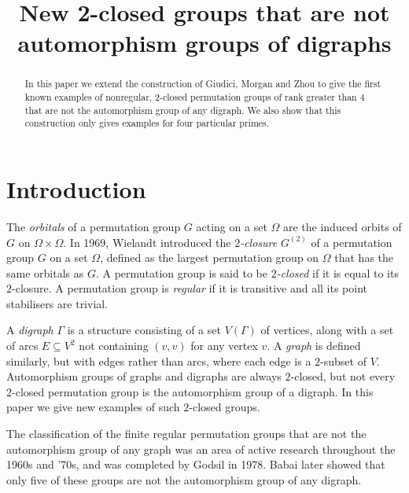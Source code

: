 \documentclass[ALCO, Unicode]{cedram}
\title{New 2-closed groups that are not automorphism groups of digraphs}
\author{\firstname{John} \lastname{Bamberg}}
\author{\firstname{Michael} \lastname{Giudici}}
\author{\firstname{Jacob} \middlename{P.} \lastname{Smith}}
\begin{document}
\begin{abstract}
In this paper we extend the construction of Giudici, Morgan and Zhou \cite{ref:giudici-primitive} to give the first known examples of nonregular, $2$-closed permutation groups of rank greater than $4$ that are not the automorphism group of any digraph. We also show that this construction only gives examples for four particular primes.
\end{abstract}

\maketitle

\section{Introduction}

The \emph{orbitals} of a permutation group $G$ acting on a set $\Omega$ are the induced orbits of $G$ on $\Omega \times \Omega$. In 1969, Wielandt \cite{ref:wielandt-invarient} introduced the \emph{$2$-closure} $G^{\left(2 \right)}$ of a permutation group $G$ on a set $\Omega$, defined as the largest permutation group on $\Omega$ that has the same orbitals as $G$. A permutation group is said to be \emph{$2$-closed} if it is equal to its $2$-closure. A permutation group is \emph{regular} if it is transitive and all its point stabilisers are trivial.

A \emph{digraph} $\Gamma$ is a structure consisting of a set $V{\left(\Gamma \right)}$ of vertices, along with a set of arcs $E \subseteq V^2$ not containing $\left(v, v \right)$ for any vertex $v$. A \emph{graph} is defined similarly, but with edges rather than arcs, where each edge is a $2$-subset of $V$. Automorphism groups of graphs and digraphs are always $2$-closed, but not every $2$-closed permutation group is the automorphism group of a digraph. In this paper we give new examples of such $2$-closed groups.

The classification of the finite regular permutation groups that are not the automorphism group of any graph was an area of active research throughout the 1960s and '70s, and was completed by Godsil \cite{ref:godsil-nonsolvable} in 1978. Babai \cite{ref:babai-drr} later showed that only five of these groups are not the automorphism group of any digraph.
\end{document}
